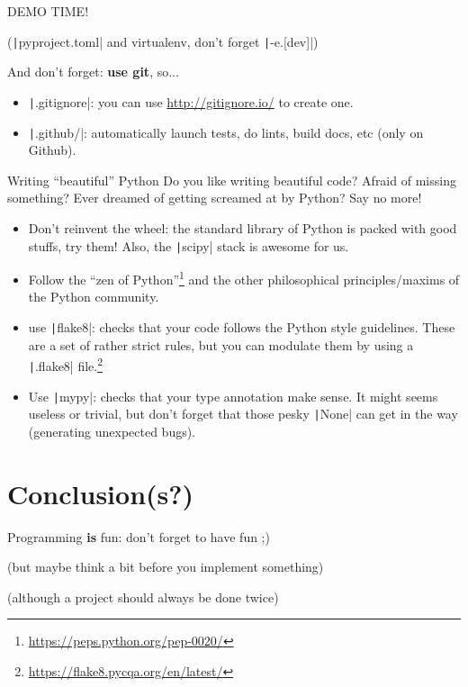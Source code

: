 \documentclass[10pt,
aspectratio=169
]{beamer}
\begin{document}
 \begin{frame}
 	\begin{center}
 		{\LARGE DEMO TIME!} 
 		
 		(\texttt|pyproject.toml| and virtualenv, don't forget \texttt|-e.[dev]|)
 	\end{center}
 	And don't forget: \textbf{use git}, so...\begin{itemize}
 		\item \texttt|.gitignore|:  you can use \url{http://gitignore.io/} to create one.
 		\item  \texttt|.github/|: automatically launch tests, do lints,  build docs, etc (only on Github).
 	\end{itemize}
 \end{frame}
 
 \begin{frame}{Writing ``beautiful'' Python}
 Do you like writing beautiful code? Afraid of missing something? Ever dreamed of getting screamed at by Python? Say no more!\begin{itemize}
 	\item Don't reinvent the wheel: the standard library of Python is packed with good stuffs, try them! Also, the  \texttt|scipy| stack is awesome for us.
 	\item Follow the ``zen of Python''\footnote{\url{https://peps.python.org/pep-0020/}} and the other philosophical principles/maxims of the Python community.
 	\item use \texttt|flake8|: checks that your code follows the Python style guidelines. These are a set of rather strict rules, but you can modulate them by using a  \texttt|.flake8| file.\footnote{\url{https://flake8.pycqa.org/en/latest/}}
 	\item Use  \texttt|mypy|: checks that your type annotation make sense. It might seems useless or trivial, but don't forget that those pesky \texttt|None| can get in the way (generating unexpected bugs).
 \end{itemize}
 \end{frame}
 
 \section{Conclusion(s?)}

 \begin{frame}
	\begin{center}
		{\LARGE Programming \textbf{is} fun: don't forget to have fun ;)}
		
		(but maybe think a bit before you implement something)
		
		(although a project should always be done twice)
	\end{center}
\end{frame}
\end{document}
